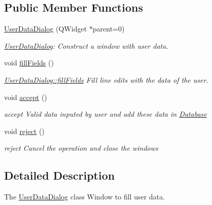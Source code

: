 \subsection*{Public Member Functions}
\begin{DoxyCompactItemize}
\item 
\hyperlink{classUserDataDialog_a51210d5e027d49b019fcd565d5b20e06}{User\+Data\+Dialog} (Q\+Widget $\ast$parent=0)
\begin{DoxyCompactList}\small\item\em \hyperlink{classUserDataDialog}{User\+Data\+Dialog}\+: Construct a window with user data. \end{DoxyCompactList}\item 
\hypertarget{classUserDataDialog_a22f266169243757212ba7eb61d083ddb}{void \hyperlink{classUserDataDialog_a22f266169243757212ba7eb61d083ddb}{fill\+Fields} ()}\label{classUserDataDialog_a22f266169243757212ba7eb61d083ddb}

\begin{DoxyCompactList}\small\item\em \hyperlink{classUserDataDialog_a22f266169243757212ba7eb61d083ddb}{User\+Data\+Dialog\+::fill\+Fields} Fill line edits with the data of the user. \end{DoxyCompactList}\item 
\hypertarget{classUserDataDialog_ad6ba344db1a10b804ca8f5f9a6ffed2c}{void \hyperlink{classUserDataDialog_ad6ba344db1a10b804ca8f5f9a6ffed2c}{accept} ()}\label{classUserDataDialog_ad6ba344db1a10b804ca8f5f9a6ffed2c}

\begin{DoxyCompactList}\small\item\em accept Valid data inputed by user and add these data in \hyperlink{classDatabase}{Database} \end{DoxyCompactList}\item 
\hypertarget{classUserDataDialog_a54519d6441212d50849de7b72ac5e623}{void \hyperlink{classUserDataDialog_a54519d6441212d50849de7b72ac5e623}{reject} ()}\label{classUserDataDialog_a54519d6441212d50849de7b72ac5e623}

\begin{DoxyCompactList}\small\item\em reject Cancel the operation and close the windows \end{DoxyCompactList}\end{DoxyCompactItemize}


\subsection{Detailed Description}
The \hyperlink{classUserDataDialog}{User\+Data\+Dialog} class Window to fill user data. 

